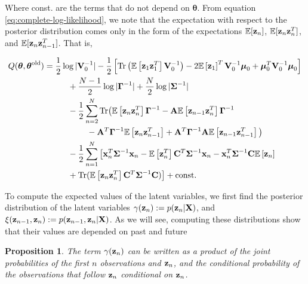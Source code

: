 \documentclass[11pt]{article}
\numberwithin{equation}{section}
\newcommand{\expectation}[1]{\mathbb{E}\left[#1\right]}
\newcommand{\x}{{\bf x}}
\newcommand{\z}{{\bf z}}
\newtheorem{proposition}{Proposition}[section]
\begin{document}
Where const. are the terms that do not depend on $\boldsymbol{\theta}$. From equation \eqref{eq:complete-log-likelihood}, we note that the expectation with respect to the posterior distribution comes only in the form of the expectations $\mathbb{E}[\z_n]$, $\mathbb{E}[\z_n\z_{n}^{T}]$, and  $\mathbb{E}[\z_n\z_{n-1}^{T}]$. That is,

\begin{align}
	Q(\boldsymbol\theta, \boldsymbol\theta^\text{old}) &= \frac{1}{2}\log \vert
	  {\bf V}_0^{-1}\vert -\frac{1}{2}\left[\text{Tr}\left(\mathbb{E}\left[\z_1 \z_1^T\right] {\bf V}_0^{-1}\right) -2 \mathbb{E}\left[\z_1\right]^T{\bf V}_0^{-1}\boldsymbol\mu_0 + \boldsymbol\mu_0^T {\bf V}_0^{-1}\boldsymbol\mu_0\right] \nonumber \\
	  &\hspace{1cm}+ \frac{N-1}{2}\log\vert\boldsymbol\Gamma^{-1}\vert + \frac{N}{2}\log\vert \boldsymbol\Sigma^{-1}\vert \nonumber \\
	  &\hspace{1cm}-\frac{1}{2} \sum_{n=2}^{N}\text{Tr}\big(\expectation{\z_n\z_n^T}\boldsymbol\Gamma^{-1} - {\bf A}\expectation{\z_{n-1}\z_n^T}\boldsymbol\Gamma^{-1} \nonumber\\
	  &\hspace{1.8cm} - {\bf A}^T\boldsymbol{\Gamma}^{-1}\expectation{\z_n\z_{n-1}^T} + {\bf A}^T\boldsymbol\Gamma^{-1}{\bf A}\expectation{\z_{n-1}\z_{n-1}^T}\big) \nonumber\\
	  &\hspace{1cm}-\frac{1}{2}\sum_{n=1}^N\big[\x_n^T\boldsymbol{\Sigma}^{-1}\x_n-\expectation{\z_n^T}{\bf C}^T \boldsymbol\Sigma^{-1}\x_n - \x_n^T\boldsymbol\Sigma^{-1}{\bf C}\expectation{\z_n} \nonumber\\
	  &\hspace{1cm} + \text{Tr}(\mathbb{E}\left[\z_n\z_n^T\right]{\bf C}^T\boldsymbol\Sigma^{-1}{\bf C})\big] + \text{const.}  \label{eq:Q-LDS}
\end{align}


To compute the expected values of the latent variables, we first find the posterior distribution of the latent variables $\gamma(\z_n) := p(\z_n\vert {\bf X})$, and $\xi(\z_{n-1}, \z_{n}) := p(\z_{n-1}, \z_n\vert {\bf X})$. As we will see, computing these distributions show that their values are depended on past and future 


\begin{proposition}\label{prop:gamma-factorisation}
	The term $\gamma(\z_n)$ can be written as a product of the joint probabilities of the first $n$ observations and $\z_n$, and the conditional probability of the observations that follow $\z_n$ conditional on $\z_n$.
\end{proposition}
\end{document}
